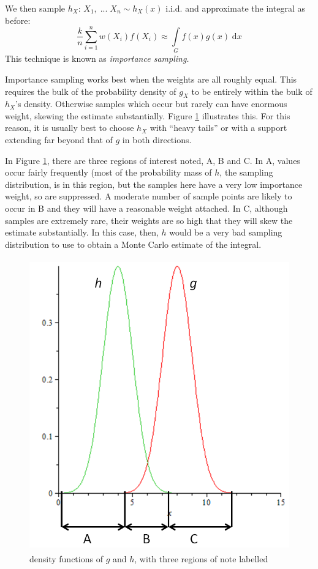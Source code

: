 \documentclass[12pt,a4paper]{article}
\begin{document}
We then sample $h_X$: $X_1, \; ... \; X_n \sim h_X(x)$ i.i.d. and approximate the integral as before:
$$\frac{k}{n} \sum_{i = 1}^n w(X_i)f(X_i) \approx \int\limits_G \!f(x) g(x)\; \mathrm{d}x$$
This technique is known as \emph{importance sampling.}

Importance sampling works best when the weights are all roughly equal. This requires the bulk of the probability density of $g_X$ to be entirely within the bulk of $h_X$'s density. Otherwise samples which occur but rarely can have enormous weight, skewing the estimate substantially. Figure \ref{importance sampling} illustrates this. For this reason, it is usually best to choose $h_X$ with ``heavy tails'' or with a support extending far beyond that of $g$ in both directions.

In Figure \ref{importance sampling}, there are three regions of interest noted, A, B and C. In A, values occur fairly frequently (most of the probability mass of $h$, the sampling distribution, is in this region, but the samples here have a very low importance weight, so are suppressed. A moderate number of sample points are likely to occur in B and they will have a reasonable weight attached. In C, although samples are extremely rare, their weights are so high that they will skew the estimate substantially. In this case, then, $h$ would be a very bad sampling distribution to use to obtain a Monte Carlo estimate of the integral.

\begin{figure}[h]
\begin{center}
\includegraphics[height=12.6cm,width=11.44cm]{M2S1 Importance Sampling.png}
\caption{density functions of $g$ and $h$, with three regions of note labelled}\label{importance sampling}
\end{center}
\end{figure}
\end{document}
